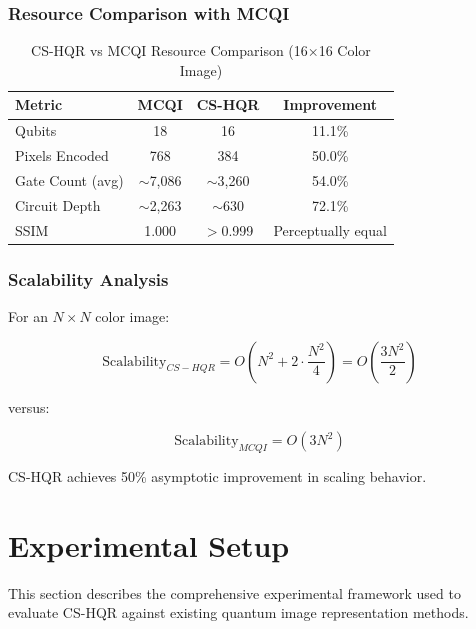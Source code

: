 \documentclass[11pt,a4paper]{article}
\begin{document}
\subsubsection{Resource Comparison with MCQI}

\begin{table}[H]
\centering
\caption{CS-HQR vs MCQI Resource Comparison (16×16 Color Image)}
\label{tab:cshqr_vs_mcqi}
\begin{tabular}{@{}lccc@{}}
\toprule
\textbf{Metric} & \textbf{MCQI} & \textbf{CS-HQR} & \textbf{Improvement} \\
\midrule
Qubits & 18 & 16 & 11.1\% \\
Pixels Encoded & 768 & 384 & 50.0\% \\
Gate Count (avg) & $\sim$7,086 & $\sim$3,260 & 54.0\% \\
Circuit Depth & $\sim$2,263 & $\sim$630 & 72.1\% \\
SSIM & 1.000 & $>$0.999 & Perceptually equal \\
\bottomrule
\end{tabular}
\end{table}

\subsubsection{Scalability Analysis}

For an $N \times N$ color image:

\begin{equation}
\text{Scalability}_{CS-HQR} = O\left(N^2 + 2 \cdot \frac{N^2}{4}\right) = O\left(\frac{3N^2}{2}\right)
\label{eq:scalability}
\end{equation}

versus:

\begin{equation}
\text{Scalability}_{MCQI} = O(3N^2)
\label{eq:mcqi_scalability}
\end{equation}

CS-HQR achieves 50\% asymptotic improvement in scaling behavior.

\section{Experimental Setup}
\label{sec:experimental_setup}

This section describes the comprehensive experimental framework used to evaluate CS-HQR against existing quantum image representation methods.
\end{document}

